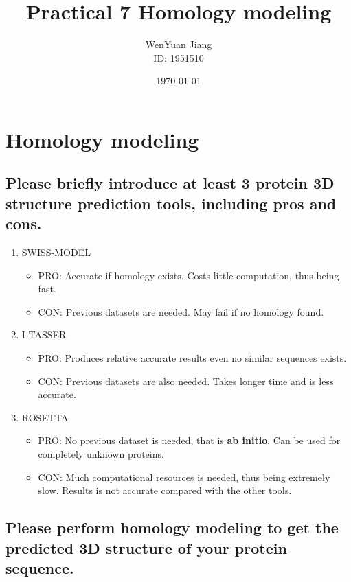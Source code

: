 \documentclass[en,black,12pt,normal]{elegantnote}
\title{Practical 7 Homology modeling}
\author{WenYuan Jiang\\ID: 1951510}
\institute{School of Life Science, Tongji University}
\date{\today}
\newcommand{\upcite}[1]{\textsuperscript{\textsuperscript{\cite{#1}}}}
\begin{document}
\maketitle

\section{Homology modeling}

\subsection{Please briefly introduce at least 3 protein 3D structure prediction tools, including pros and cons.}

\begin{enumerate}
    \item SWISS-MODEL\upcite{guex1997swiss}
    \begin{itemize}
        \item PRO: Accurate if homology exists. Costs little computation, thus being fast.
        \item CON: Previous datasets are needed. May fail if no homology found.
    \end{itemize}
    \item I-TASSER\upcite{zhang2008tasser}
    \begin{itemize}
        \item PRO: Produces relative accurate results even no similar sequences exists.
        \item CON: Previous datasets are also needed. Takes longer time and is less accurate.
    \end{itemize}
    \item ROSETTA\upcite{rohl2004protein}
    \begin{itemize}
        \item PRO: No previous dataset is needed, that is \textbf{ab initio}. Can be used for completely unknown proteins.
        \item CON: Much computational resources is needed, thus being extremely slow. Results is not accurate compared with the other tools.
    \end{itemize}
\end{enumerate}


\subsection{Please perform homology modeling to get the predicted 3D structure of your protein sequence.}
\end{document}
